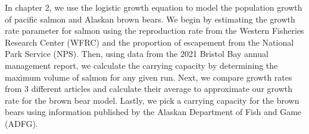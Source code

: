 




In chapter 2, we use the logistic growth equation to model the population growth of pacific salmon and Alaskan brown bears.
We begin by estimating the growth rate parameter for salmon using the reproduction rate from the Western Fisheries Research Center (WFRC) and the proportion of escapement from the National Park Service (NPS).
Then, using data from the 2021 Bristol Bay annual management report, we calculate the carrying capacity by determining the maximum volume of salmon for any given run.
Next, we compare growth rates from 3 different articles and calculate their average to approximate our growth rate for the brown bear model.
Lastly, we pick a carrying capacity for the brown bears using information published by the Alaskan Department of Fish and Game (ADFG).





